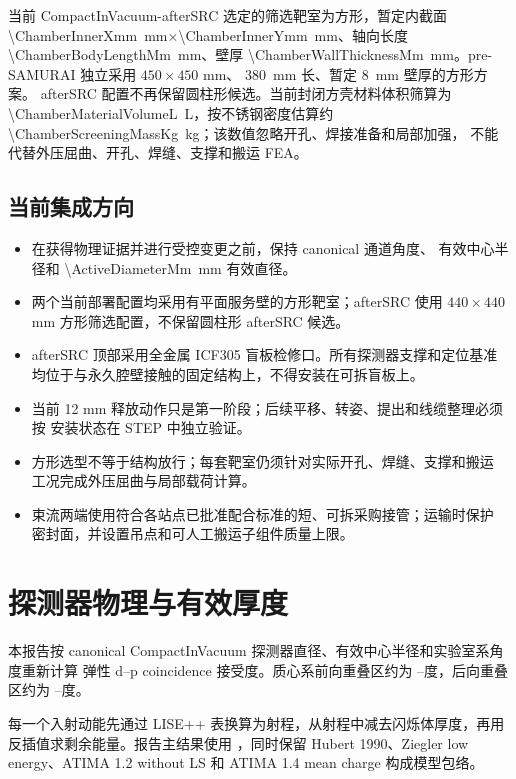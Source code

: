 \documentclass[UTF8,10pt,letterpaper,fontset=none]{ctexart}
\begin{document}
当前 CompactInVacuum-afterSRC 选定的筛选靶室为方形，暂定内截面
\SI{\ChamberInnerXmm}{\milli\meter}$\times$\SI{\ChamberInnerYmm}{\milli\meter}、轴向长度
\SI{\ChamberBodyLengthMm}{\milli\meter}、壁厚
\SI{\ChamberWallThicknessMm}{\milli\meter}。pre-SAMURAI 独立采用 $450\times450$ mm、
\SI{380}{\milli\meter} 长、暂定 \SI{8}{\milli\meter} 壁厚的方形方案。
afterSRC 配置不再保留圆柱形候选。当前封闭方壳材料体积筛算为
\SI{\ChamberMaterialVolumeL}{\liter}，按不锈钢密度估算约
\SI{\ChamberScreeningMassKg}{\kilogram}；该数值忽略开孔、焊接准备和局部加强，
不能代替外压屈曲、开孔、焊缝、支撑和搬运 FEA。

\subsection{当前集成方向}

\begin{itemize}
  \item 在获得物理证据并进行受控变更之前，保持 canonical 通道角度、
    有效中心半径和 \SI{\ActiveDiameterMm}{\milli\meter} 有效直径。
  \item 两个当前部署配置均采用有平面服务壁的方形靶室；afterSRC 使用
    $440\times440$ mm 方形筛选配置，不保留圆柱形 afterSRC 候选。
  \item afterSRC 顶部采用全金属 ICF305 盲板检修口。所有探测器支撑和定位基准
    均位于与永久腔壁接触的固定结构上，不得安装在可拆盲板上。
  \item 当前 12 mm 释放动作只是第一阶段；后续平移、转姿、提出和线缆整理必须按
    安装状态在 STEP 中独立验证。
  \item 方形选型不等于结构放行；每套靶室仍须针对实际开孔、焊缝、支撑和搬运
    工况完成外压屈曲与局部载荷计算。
  \item 束流两端使用符合各站点已批准配合标准的短、可拆采购接管；运输时保护
    密封面，并设置吊点和可人工搬运子组件质量上限。
\end{itemize}

\section{探测器物理与有效厚度}

本报告按 canonical CompactInVacuum 探测器直径、有效中心半径和实验室系角度重新计算
弹性 d--p coincidence 接受度。质心系前向重叠区约为
\ForwardCmLow--\ForwardCmHigh 度，后向重叠区约为
\BackwardCmLow--\BackwardCmHigh 度。

每一个入射动能先通过 LISE++ 表换算为射程，从射程中减去闪烁体厚度，再用
反插值求剩余能量。报告主结果使用 \LisePrimaryRangeModel，同时保留
Hubert 1990、Ziegler low energy、ATIMA 1.2 without LS 和
ATIMA 1.4 mean charge 构成模型包络。
\end{document}
